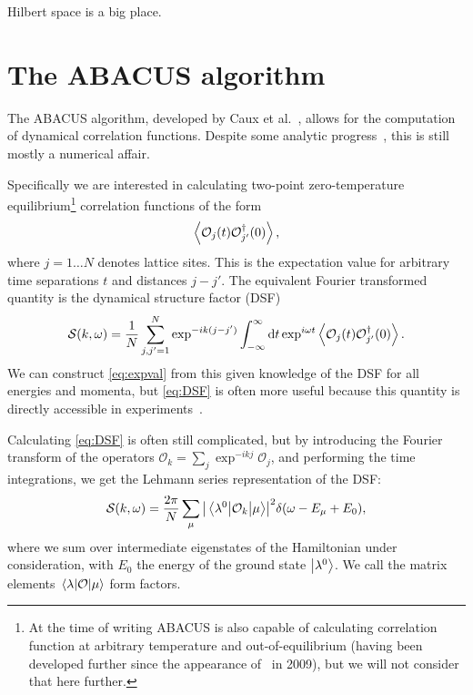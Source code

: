 \documentclass[11pt, a4paper]{report} %
\begin{document}
\begin{savequote}[50mm]
Hilbert space is a big place.
\end{savequote}


\chapter{The ABACUS algorithm}\label{chap:abacus}

The ABACUS algorithm, developed by Caux et al.~\cite{Caux2005, Caux2007, Caux2007a, Caux2005a}, allows for the computation of dynamical correlation functions.
Despite some analytic progress~\cite{Nardis2016,Nardis2015,slavnov90_noneq_time_curren_correl_funct}, this is still mostly a numerical affair.

Specifically we are interested in calculating two-point zero-temperature equilibrium\footnote{At the time of writing ABACUS is also capable of calculating correlation function at arbitrary temperature and out-of-equilibrium (having been developed further since the appearance of~\cite{Caux2009} in 2009), but we will not consider that here further.} correlation functions of the form
\begin{equation}\label{eq:expval}
	\expval{\mathcal{O}_j(t)\mathcal{O}_{j'}^{\dagger}(0)},
\end{equation}
where \(j=1\ldots N\) denotes lattice sites.
This is the expectation value for arbitrary time separations $t$ and distances $j-j'$.
The equivalent Fourier transformed quantity is the dynamical structure factor (DSF)
\begin{equation}\label{eq:DSF}
	\mathcal{S}(k,\omega) = \frac{1}{N} \sum_{j,j'=1}^{N} \exp^{-ik(j-j')} \int_{-\infty}^{\infty}\dd t \exp^{i\omega t}\expval{\mathcal{O}_j(t)\mathcal{O}_{j'}^{\dagger}(0)}.
\end{equation}
We can construct \cref{eq:expval} from this given knowledge of the DSF for all energies and momenta, but \cref{eq:DSF} is often more useful because this quantity is directly accessible in experiments~\cite{Caux2009,Caux2007a}.

Calculating \cref{eq:DSF} is often still complicated, but by introducing the Fourier transform of the operators $\mathcal{O}_k=\sum_j \exp^{-ikj} \mathcal{O}_j$, and performing the time integrations, we get the Lehmann series representation of the DSF:\@
\begin{equation}
  \label{eq:lehman}
  \mathcal{S}(k,\omega) = \frac{2\pi}{N}\sum_{\mu}\abs{\mel{\lambda^0}{\mathcal{O}_k}{\mu}}^2 \delta\qty(\omega-E_{\mu}+E_0), 
\end{equation}
where we sum over intermediate eigenstates of the Hamiltonian under consideration, with $E_0$ the energy of the ground state $\ket{\lambda^0}$.
We call the matrix elements $\mel{\lambda}{\mathcal{O}}{\mu}$ form factors.
\end{document}
